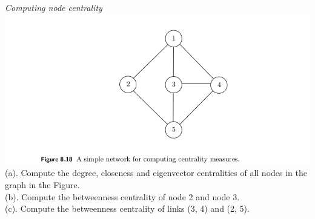\documentclass[12pt]{article}
\newenvironment{problem}[2][Problem]{\begin{trivlist}
\item[\hskip \labelsep {\bfseries #1}\hskip \labelsep {\bfseries #2.}]}{\end{trivlist}}
\begin{document}
	\begin{problem}{1} \textit{Computing node centrality} \\
		\includegraphics[width=\linewidth]{./1.png} \\
		(a). Compute the degree, closeness and eigenvector centralities of all nodes in the graph in the Figure.\\
		(b). Compute the betweenness centrality of node 2 and node 3.\\
		(c). Compute the betweenness centrality of links (3, 4) and (2, 5).
	\end{problem}
\end{document}
